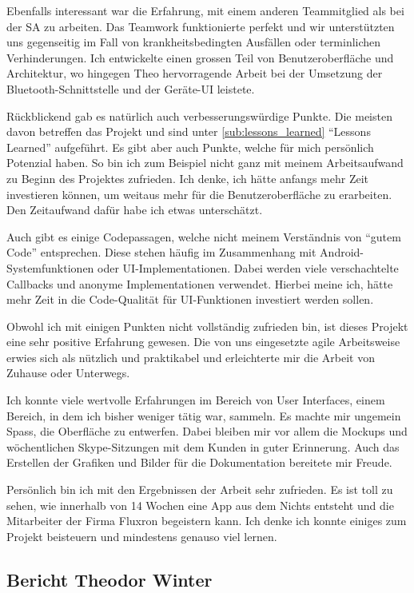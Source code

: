Ebenfalls interessant war die Erfahrung, mit einem anderen Teammitglied als bei der SA zu arbeiten. Das Teamwork funktionierte perfekt und wir unterstützten uns gegenseitig im Fall von krankheitsbedingten Ausfällen oder terminlichen Verhinderungen. Ich entwickelte einen grossen Teil von Benutzeroberfläche und Architektur, wo hingegen Theo hervorragende Arbeit bei der Umsetzung der Bluetooth-Schnittstelle und der Geräte-UI leistete.

Rückblickend gab es natürlich auch verbesserungswürdige Punkte. Die meisten davon betreffen das Projekt und sind unter \ref{sub:lessons_learned} \enquote{Lessons Learned} aufgeführt. Es gibt aber auch Punkte, welche für mich persönlich Potenzial haben. So bin ich zum Beispiel nicht ganz mit meinem Arbeitsaufwand zu Beginn des Projektes zufrieden. Ich denke, ich hätte anfangs mehr Zeit investieren können, um weitaus mehr für die Benutzeroberfläche zu erarbeiten. Den Zeitaufwand dafür habe ich etwas unterschätzt.

Auch gibt es einige Codepassagen, welche nicht meinem Verständnis von \enquote{gutem Code} entsprechen. Diese stehen häufig im Zusammenhang mit Android-Systemfunktionen oder UI-Implementationen. Dabei werden viele verschachtelte Callbacks und anonyme Implementationen verwendet. Hierbei meine ich, hätte  mehr Zeit in die Code-Qualität für UI-Funktionen investiert werden sollen.

Obwohl ich mit einigen Punkten nicht vollständig zufrieden bin, ist dieses Projekt eine sehr positive Erfahrung gewesen. Die von uns eingesetzte agile Arbeitsweise erwies sich als nützlich und praktikabel und erleichterte mir die Arbeit von Zuhause oder Unterwegs.

Ich konnte viele wertvolle Erfahrungen im Bereich von User Interfaces, einem Bereich, in dem ich bisher weniger tätig war, sammeln. Es machte mir ungemein Spass, die Oberfläche zu entwerfen. Dabei bleiben mir vor allem die Mockups und wöchentlichen Skype-Sitzungen mit dem Kunden in guter Erinnerung. Auch das Erstellen der Grafiken und Bilder für die Dokumentation bereitete mir Freude.

Persönlich bin ich mit den Ergebnissen der Arbeit sehr zufrieden. Es ist toll zu sehen, wie innerhalb von 14 Wochen eine App aus dem Nichts entsteht und die Mitarbeiter der Firma Fluxron begeistern kann. Ich denke ich konnte einiges zum Projekt beisteuern und mindestens genauso viel lernen.

\subsection{Bericht Theodor Winter}

